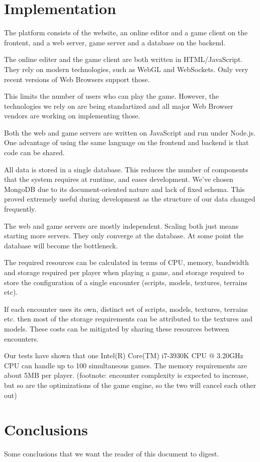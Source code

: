 \documentclass[10pt]{scrartcl}
\begin{document}
\section{Implementation}

The platform consists of the website, an online editor and a game client on
    the frontent, and a web server, game server and a database on the backend.

The online editer and the game client are both written in HTML/JavaScript.
They rely on modern technologies, such as WebGL and WebSockets. Only very
    recent versions of Web Browsers support those.

This limits the number of users who can play the game. However, the
    technologies we rely on are being standartized and all major Web Browser
    vendors are working on implementing those.

Both the web and game servers are written on JavaScript and run under Node.js.
    One advantage of using the same language on the frontend and backend is
    that code can be shared.

All data is stored in a single database. This reduces the number of components
    that the system requires at runtime, and eases development.
We've chosen MongoDB due to its document-oriented nature and lack of fixed
    schema. This proved extremely useful during development as the structure
    of our data changed frequently.

The web and game servers are mostly independent. Scaling both just means
    starting more servers.
They only converge at the database. At some point the database will become the
    bottleneck.

The required resources can be calculated in terms of CPU, memory, bandwidth
    and storage required per player when playing a game, and storage required
    to store the configuration of a single encounter (scripts, models,
    textures, terrains etc).

If each encounter uses its own, distinct set of scripts, models, textures,
    terrains etc. then most of the storage requirements can be attributed to
    the textures and models.
These costs can be mitigated by sharing these resources between encounters.

Our tests have shown that one Intel(R) Core(TM) i7-3930K CPU @ 3.20GHz CPU can
    handle up to 100 simultaneous games. The memory requirements are about 5MB
    per player.
(footnote: encounter complexity is expected to increase, but so are the
    optimizations of the game engine, so the two will cancel each other out)


\section{Conclusions}

Some conclusions that we want the reader of this document to digest.
\end{document}
